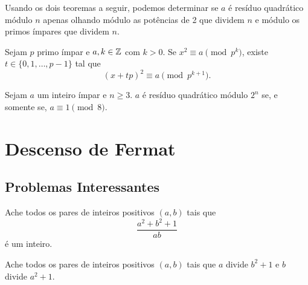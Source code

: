\documentclass[10pt, a4paper]{report}
\begin{document}
	Usando os dois teoremas a seguir, podemos determinar se $a$ é resíduo quadrático módulo ${n}$ apenas olhando módulo as potências de 2 que dividem $n$ e módulo os primos ímpares que dividem $n$.

	\begin{thm}
		Sejam $p$ primo ímpar e $a, k \in \mathbb{Z}$ com $k > 0$. Se $x^2 \equiv a \pmod{p^k}$, existe $t \in \{0, 1, \dots, p-1\}$ tal que \[(x+tp)^2 \equiv a \pmod{p^{k+1}}.\]
	\end{thm}
	\begin{thm}
		Sejam $a$ um inteiro ímpar e $n \ge 3$. $a$ é resíduo quadrático módulo ${2^n}$ se, e somente se, $a \equiv 1 \pmod{8}$.
	\end{thm}


	\chapter{Descenso de Fermat}

	\begin{exer}
	\end{exer}

	\newpage
	\section{Problemas Interessantes}

	\begin{prob}
		Ache todos os pares de inteiros positivos $(a, b)$ tais que  \[
			\frac{a^2 + b^2 + 1}{ab}
		\]
		é um inteiro.
	\end{prob}

	\begin{prob}
		Ache todos os pares de inteiros positivos $(a, b)$ tais que $a$ divide $b^2 + 1$ e $b$ divide $a^2 + 1$.
	\end{prob}



\end{document}
